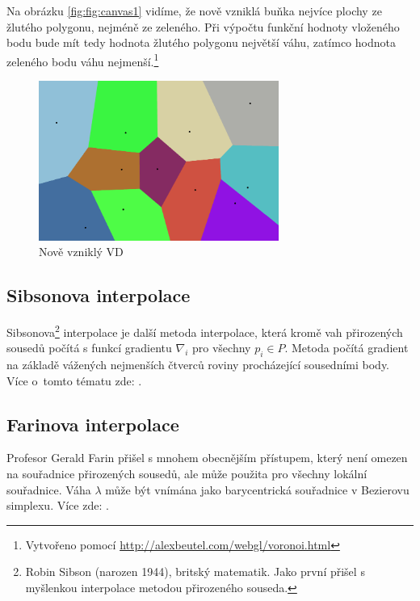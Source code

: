 \documentclass[12pt,a4paper]{article}
\begin{document}
Na obrázku \ref{fig:fig:canvas1} vidíme, že nově vzniklá buňka  nejvíce plochy ze žlutého polygonu, nejméně ze zeleného. Při výpočtu funkční hodnoty vloženého bodu bude mít tedy hodnota žlutého polygonu největší váhu, zatímco hodnota zeleného bodu váhu nejmenší.\footnote{Vytvořeno pomocí \url{http://alexbeutel.com/webgl/voronoi.html}}
\begin{figure}[h!]
\centering
\includegraphics[width=0.7\textwidth]{img/canvas_2.png}
\caption{Nově vzniklý VD}
\label{fig:fig:canvas2}
\end{figure}

\newpage
\subsection{Sibsonova interpolace}
\label{sub:Sibson}
Sibsonova\footnote{Robin Sibson (narozen 1944), britský matematik. Jako první přišel s myšlenkou interpolace metodou přirozeného souseda.} interpolace je další metoda interpolace, která kromě vah přirozených sousedů počítá s funkcí gradientu $\nabla_i$ pro všechny $p_i \in P$. Metoda počítá gradient na základě vážených nejmenších čtverců roviny procházející sousedními body. Více o~tomto tématu zde: \cite{Bobach} \cite{CGAL}.

\subsection{Farinova interpolace}
\label{sub:Farin}
Profesor Gerald Farin přišel s mnohem obecnějším přístupem, který není omezen na souřadnice přirozených sousedů, ale může použita pro všechny lokální souřadnice. Váha $\lambda$ může být vnímána jako barycentrická souřadnice v Bezierovu simplexu. Více zde: \cite{Bobach} \cite{CGAL}.
\end{document}
